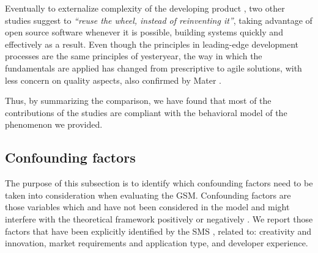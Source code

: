 \documentclass[10pt,journal,letterpaper,compsoc]{IEEEtran}
\begin{document}
Eventually to externalize complexity of the developing product
, two other studies \cite{Wall2001, Bean2005} suggest to \textit{``reuse the 
wheel, instead of reinventing it''}, taking advantage of open source software 
whenever it is possible, building systems quickly and effectively as a result. 
Even though the principles in leading-edge development processes are the same 
principles of yesteryear, the way in which the fundamentals are applied has 
changed from prescriptive to agile solutions, with less concern on quality 
aspects, also confirmed by Mater \cite{Mater2000}.


Thus, by summarizing the comparison, we have found that most of the 
contributions of the studies are compliant with the behavioral model of the 
phenomenon we provided.

\subsection{Confounding factors}
\label{sect:an:comp:cat-vs-literature:conf}

The purpose of this subsection is to identify which confounding factors need to 
be taken into consideration when evaluating the GSM. Confounding factors are 
those variables which and have not been considered in the model and might 
interfere with the theoretical framework positively or negatively 
\cite{ColinRobson2009}. We report those factors that have been explicitly 
identified by the SMS \cite{SMS} %
, related to: creativity and innovation, market requirements and application 
type, and developer experience.
\end{document}
